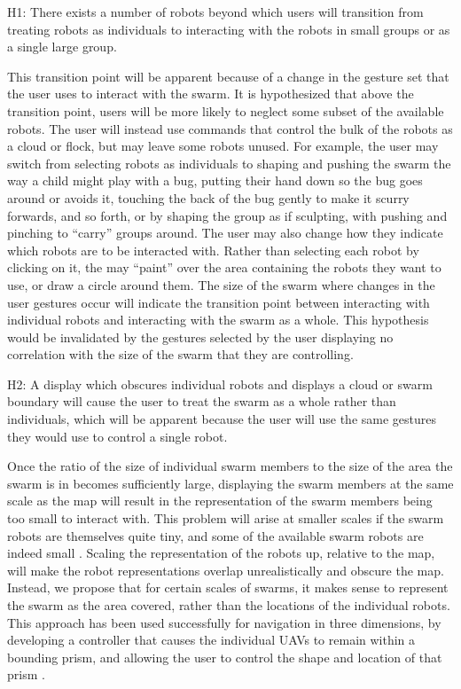 H1: There exists a number of robots beyond which users will transition from treating robots as individuals to interacting with the robots in small groups or as a single large group. 

This transition point will be apparent because of a change in the gesture set that the user uses to interact with the swarm. 
It is hypothesized that above the transition point, users will be more likely to neglect some subset of the available robots. 
The user will instead use commands that control the bulk of the robots as a cloud or flock, but may leave some robots unused. 
For example, the user may switch from selecting robots as individuals to shaping and pushing the swarm the way a child might play with a bug, putting their hand down so the bug goes around or avoids it, touching the back of the bug gently to make it scurry forwards, and so forth, or by shaping the group as if sculpting, with pushing and pinching to ``carry'' groups around. 
The user may also change how they indicate which robots are to be interacted with. 
Rather than selecting each robot by clicking on it, the may ``paint'' over the area containing the robots they want to use, or draw a circle around them. 
The size of the swarm where changes in the user gestures occur will indicate the transition point between interacting with individual robots and interacting with the swarm as a whole. 
This hypothesis would be invalidated by the gestures selected by the user displaying no correlation with the size of the swarm that they are controlling. 

H2: A display which obscures individual robots and displays a cloud or swarm boundary will cause the user to treat the swarm as a whole rather than individuals, which will be apparent because the user will use the same gestures they would use to control a single robot. 

Once the ratio of the size of individual swarm members to the size of the area the swarm is in becomes sufficiently large, displaying the swarm members at the same scale as the map will result in the representation of the swarm members being too small to interact with. 
This problem will arise at smaller scales if the swarm robots are themselves quite tiny, and some of the available swarm robots are indeed small \citep{pelrine2012diamagnetically}.
Scaling the representation of the robots up, relative to the map, will make the robot representations overlap unrealistically and obscure the map. 
Instead, we propose that for certain scales of swarms, it makes sense to represent the swarm as the area covered, rather than the locations of the individual robots.
This approach has been used successfully for navigation in three dimensions, by developing a controller that causes the individual UAVs to remain within a bounding prism, and allowing the user to control the shape and location of that prism \citep{ayanian2014controlling}.

